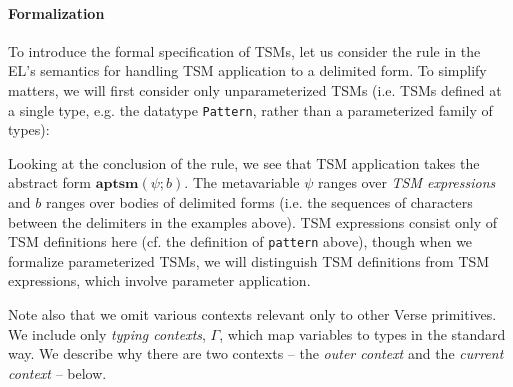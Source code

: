 \paragraph{Formalization} To introduce the formal specification of TSMs, let us consider the rule in the EL's semantics for handling TSM application to a delimited form. To simplify matters, we will first consider only unparameterized TSMs (i.e. TSMs defined at a single type, e.g. the  datatype \lstinline{Pattern}, rather than a parameterized family of types): 
\begin{mathpar}
\end{mathpar}
Looking at the conclusion of the rule, we see that TSM application takes the abstract form $\mathbf{aptsm}(\psi; b)$. The metavariable $\psi$ ranges over \emph{TSM expressions} and $b$ ranges over {bodies} of delimited forms (i.e. the sequences of characters between the delimiters in the examples above). TSM expressions consist only of TSM definitions here (cf. the definition of \lstinline{pattern} above), though when we formalize parameterized TSMs, we will distinguish TSM definitions from TSM expressions, which involve parameter application.%

Note also that we omit various contexts relevant only to other Verse primitives. We include only \emph{typing contexts}, $\Gamma$, which map variables to types in the standard way. We describe why there are two contexts -- the \emph{outer context} and the \emph{current context} -- below. 


